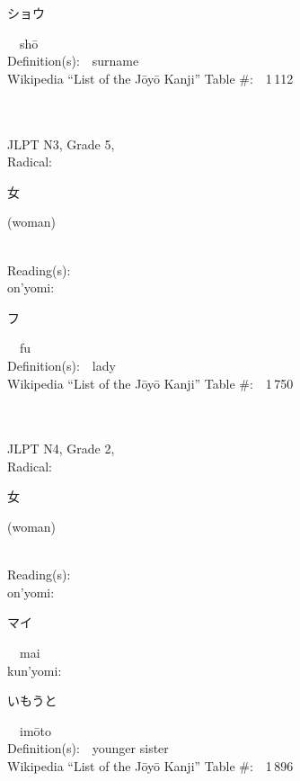 \begin{multicols}{2}
{\hspace*{2em}}{\begin{CJK}{UTF8}{min} ショウ \end{CJK}}\ \ sh\=o\ \ \\
Definition(s):\ \ surname \\
Wikipedia ``List of the J\=oy\=o Kanji'' Table \#:\ \ 1\,112 \\
\ \ \\
{\fontsize{34pt}{40pt}  }\ \ \\  %
{JLPT N3, Grade 5, \\Radical:\ \ {\begin{CJK}{UTF8}{min} 女 \end{CJK}} (woman) } \\
Reading(s):\ \ \\
{\hspace*{1em}}on'yomi:\ \ \\
{\hspace*{2em}}{\begin{CJK}{UTF8}{min} フ \end{CJK}}\ \ fu\ \ \\
Definition(s):\ \ lady \\
Wikipedia ``List of the J\=oy\=o Kanji'' Table \#:\ \ 1\,750 \\
\ \ \\
{\fontsize{34pt}{40pt}  }\ \ \\  %
{JLPT N4, Grade 2, \\Radical:\ \ {\begin{CJK}{UTF8}{min} 女 \end{CJK}} (woman) } \\
Reading(s):\ \ \\
{\hspace*{1em}}on'yomi:\ \ \\
{\hspace*{2em}}{\begin{CJK}{UTF8}{min} マイ \end{CJK}}\ \ mai\ \ \\
{\hspace*{1em}}kun'yomi:\ \ \\
{\hspace*{2em}}{\begin{CJK}{UTF8}{min} いもうと \end{CJK}}\ \ im\=oto\ \ \\
Definition(s):\ \ younger sister \\
Wikipedia ``List of the J\=oy\=o Kanji'' Table \#:\ \ 1\,896 \\
\ \ \\
\end{multicols}


